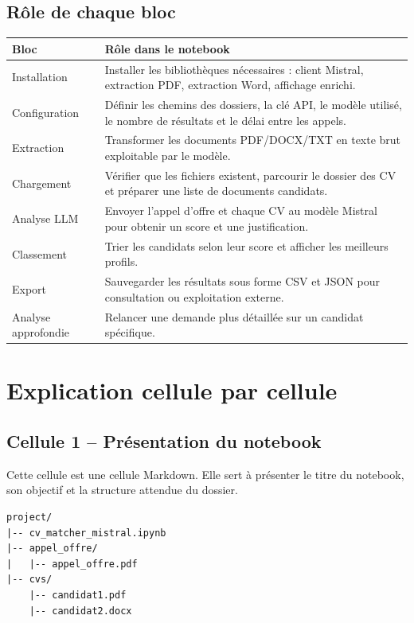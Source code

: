\documentclass[12pt,a4paper]{article}
\begin{document}
\subsection{Rôle de chaque bloc}

\begin{longtable}{|p{3.4cm}|p{10.4cm}|}
\hline
\textbf{Bloc} & \textbf{Rôle dans le notebook} \\
\hline
Installation & Installer les bibliothèques nécessaires : client Mistral, extraction PDF, extraction Word, affichage enrichi. \\
\hline
Configuration & Définir les chemins des dossiers, la clé API, le modèle utilisé, le nombre de résultats et le délai entre les appels. \\
\hline
Extraction & Transformer les documents PDF/DOCX/TXT en texte brut exploitable par le modèle. \\
\hline
Chargement & Vérifier que les fichiers existent, parcourir le dossier des CV et préparer une liste de documents candidats. \\
\hline
Analyse LLM & Envoyer l'appel d'offre et chaque CV au modèle Mistral pour obtenir un score et une justification. \\
\hline
Classement & Trier les candidats selon leur score et afficher les meilleurs profils. \\
\hline
Export & Sauvegarder les résultats sous forme CSV et JSON pour consultation ou exploitation externe. \\
\hline
Analyse approfondie & Relancer une demande plus détaillée sur un candidat spécifique. \\
\hline
\end{longtable}

\section{Explication cellule par cellule}

\subsection{Cellule 1 -- Présentation du notebook}

Cette cellule est une cellule Markdown. Elle sert à présenter le titre du notebook, son objectif et la structure attendue du dossier.

\begin{verbatim}
project/
|-- cv_matcher_mistral.ipynb
|-- appel_offre/
|   |-- appel_offre.pdf
|-- cvs/
    |-- candidat1.pdf
    |-- candidat2.docx
\end{verbatim}
\end{document}
